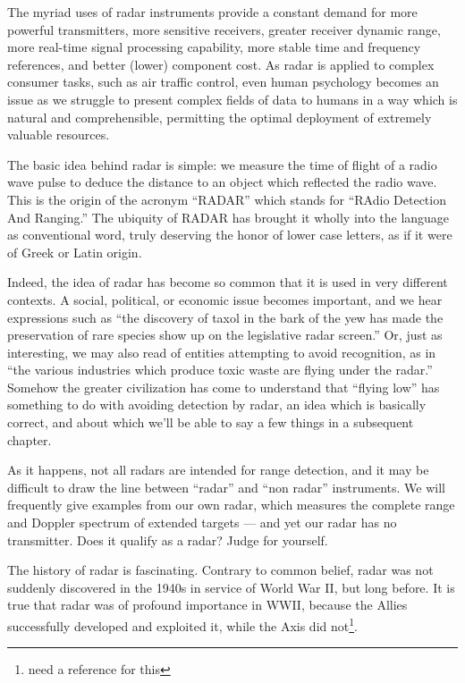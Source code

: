 The myriad uses of radar instruments provide a constant demand for
more powerful transmitters, more sensitive receivers, greater receiver
dynamic range, more real-time signal processing capability, more
stable time and frequency references, and better (lower) component
cost.  As radar is applied to complex consumer tasks, such as air
traffic control, even human psychology becomes an issue as we struggle
to present complex fields of data to humans in a way which is natural
and comprehensible, permitting the optimal deployment of extremely
valuable resources.

The basic idea behind radar is simple: we measure the time of flight
of a radio wave pulse to deduce the distance to an object which
reflected the radio wave.  This is the origin of the acronym ``RADAR''
which stands for ``RAdio Detection And Ranging.'' The ubiquity of
RADAR has brought it wholly into the language as conventional word,
truly deserving the honor of lower case letters, as if it were of Greek or Latin origin.

Indeed, the idea of radar has become so common that it is used in very
different contexts.  A social, political, or economic issue becomes
important, and we hear expressions such as ``the discovery of taxol in
the bark of the yew has made the preservation of rare species show up
on the legislative radar screen.''  Or, just as interesting, we may
also read of entities attempting to avoid recognition, as in ``the
various industries which produce toxic waste are flying under the 
radar.''  Somehow the greater civilization has come to understand that 
``flying low'' has something to do with avoiding detection by radar, an 
idea which is basically correct, and about which we'll be able to say a 
few things in a subsequent chapter.

As it happens, not all radars are intended for range detection, and it
may be difficult to draw the line between ``radar'' and ``non radar''
instruments.  We will frequently give examples from our own radar,
which measures the complete range and Doppler spectrum of extended
targets --- and yet our radar has no transmitter.  Does it qualify as
a radar?  Judge for yourself.

The history of radar is fascinating.  Contrary to common belief, radar
was not suddenly discovered in the 1940s in service of World War II, but 
long before.  It is true that radar was of profound importance in WWII, 
because the Allies successfully developed and exploited it, while the
Axis did not\footnote{need a reference for this}.

